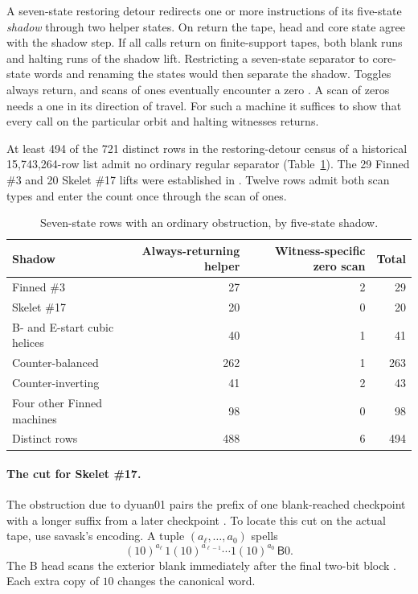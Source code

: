 \documentclass[11pt]{article}
\newcommand{\state}[1]{\mathsf{#1}}
\begin{document}
A seven-state restoring detour redirects one or more instructions of its five-state \emph{shadow} through two helper states. On return the tape, head and core state agree with the shadow step. If all calls return on finite-support tapes, both blank runs and halting runs of the shadow lift. Restricting a seven-state separator to core-state words and renaming the states would then separate the shadow. Toggles always return, and scans of ones eventually encounter a zero \cite{detours}. A scan of zeros needs a one in its direction of travel. For such a machine it suffices to show that every call on the particular orbit and halting witnesses returns.

At least 494 of the 721 distinct rows in the restoring-detour census of a historical 15,743,264-row list admit no ordinary regular separator (Table~\ref{liftcounts}). The 29 Finned \#3 and 20 Skelet \#17 lifts were established in \cite{detours}. Twelve rows admit both scan types and enter the count once through the scan of ones.

\begin{table}[ht]
\centering
\caption{Seven-state rows with an ordinary obstruction, by five-state shadow.}\label{liftcounts}
\begin{tabular}{@{}lrrr@{}}
\toprule
Shadow & Always-returning helper & Witness-specific zero scan & Total\\
\midrule
Finned \#3 & 27 & 2 & 29\\
Skelet \#17 & 20 & 0 & 20\\
B- and E-start cubic helices & 40 & 1 & 41\\
Counter-balanced & 262 & 1 & 263\\
Counter-inverting & 41 & 2 & 43\\
Four other Finned machines & 98 & 0 & 98\\
\midrule
Distinct rows & 488 & 6 & 494\\
\bottomrule
\end{tabular}
\end{table}

\paragraph{The cut for Skelet \#17.}
The obstruction due to dyuan01 pairs the prefix of one blank-reached checkpoint with a longer suffix from a later checkpoint \cite{dyuan}. To locate this cut on the actual tape, use savask's encoding. A tuple \((a_\ell,\ldots,a_0)\) spells
\[
   (10)^{a_\ell}\,1(10)^{a_{\ell-1}}\cdots 1(10)^{a_0}\,\state B0 .
\]
The B head scans the exterior blank immediately after the final two-bit block \cite[pp.~1--2]{savask}. Each extra copy of \(10\) changes the canonical word.
\end{document}
